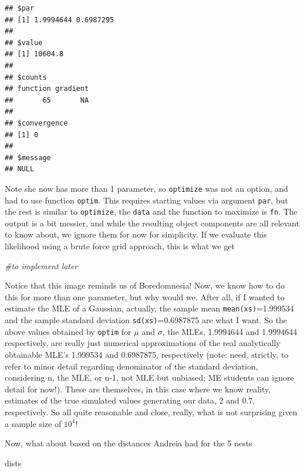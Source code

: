 \documentclass[
]{book}
\newenvironment{Shaded}{\begin{snugshade}}{\end{snugshade}}
\newcommand{\CommentTok}[1]{\textcolor[rgb]{0.56,0.35,0.01}{\textit{#1}}}
\newcommand{\NormalTok}[1]{#1}
\begin{document}
\begin{verbatim}
## $par
## [1] 1.9994644 0.6987295
## 
## $value
## [1] 10604.8
## 
## $counts
## function gradient 
##       65       NA 
## 
## $convergence
## [1] 0
## 
## $message
## NULL
\end{verbatim}

Note she now has more than 1 parameter, so \texttt{optimize} was not an option, and had to use function \texttt{optim}. This requires starting values via argument \texttt{par}, but the rest is similar to \texttt{optimize}, the \texttt{data} and the function to maximize is \texttt{fn}. The output is a bit messier, and while the resulting object components are all relevant to know about, we ignore them for now for simplicity. If we evaluate this likelihood using a brute force grid approach, this is what we get

\begin{Shaded}
\begin{Highlighting}[]
\CommentTok{#to implement later}
\end{Highlighting}
\end{Shaded}

Notice that this image reminds us of Boredomnesia! Now, we know how to do this for more than one parameter, but why would we. After all, if I wanted to estimate the MLE of a Gaussian, actually, the sample mean \texttt{mean(xs)}=1.999534 and the sample standard deviation \texttt{sd(xs)}=0.6987875 are what I want. So the above values obtained by \texttt{optim} for \(\mu\) and \(\sigma\), the MLEs, 1.9994644 and 1.9994644 respectively, are really just numerical approximations of the real analytically obtainable MLE's 1.999534 and 0.6987875, respectively (note: need, strictly, to refer to minor detail regarding denominator of the standard deviation, considering n, the MLE, or n-1, not MLE but unbiased; ME students can ignore detail for now!). These are themselves, in this case where we know reality, estimates of the true simulated values generating our data, 2 and 0.7, respectively. So all quite reasonable and close, really, what is not surprising given a sample size of \ensuremath{10^{4}}!

Now, what about based on the distances Andreia had for the 5 nests

\begin{Shaded}
\begin{Highlighting}[]
\NormalTok{dists}
\end{Highlighting}
\end{Shaded}
\end{document}
